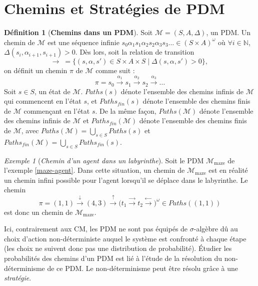 \documentclass[12pt,a4paper]{report}
\theoremstyle{definition}%
\newtheorem{definition}{Définition}[chapter]
\theoremstyle{remark}
\newtheorem{example}{Exemple}[chapter]
\begin{document}
\section{Chemins et Stratégies de PDM}

\begin{definition}[\textbf{Chemins dans un PDM}]
	Soit $\mathcal{M} = (S, A, \Delta)$, un PDM. Un chemin de $\mathcal{M}$ est une
	séquence infinie $s_0 \alpha_1 s_1 \alpha_2 s_2 \alpha_3 s_3 \dots \in (S \times A)^\omega$
	où $\forall i \in \mathbb{N}$, $\Delta(s_i, \alpha_{i+1}, s_{i+1}) > 0$. Dès lors, soit la relation de
	transition
	\[\rightarrow \; =  \{ (s, \alpha, s') \in S \times A \times S \; | \; \Delta(s, \alpha, s') > 0 \}, \,\]
	on définit un chemin $\pi$ de $\mathcal{M}$ comme suit :
	\[ \pi = s_0 \xrightarrow{\alpha_1} s_1 \xrightarrow{\alpha_2} s_2 \xrightarrow{\alpha_3} \dots \]
	Soit $s \in S$, un état de $\mathcal{M}$. $Paths(s)$ dénote l'ensemble des chemins
	infinis de $\mathcal{M}$ qui commencent en l'état $s$, et
	$Paths_{fin}(s)$ dénote l'ensemble des chemins finis de $\mathcal{M}$ commençant en l'état $s$.
	De la même façon, $Paths(\mathcal{M})$ dénote l'ensemble des chemins infinis de $\mathcal{M}$ et $Paths_{fin}(\mathcal{M})$ dénote l'ensemble des chemins finis de
	$\mathcal{M}$, avec $Paths(\mathcal{M}) = \bigcup_{s \in S} Paths(s)$ et
	$Paths_{fin}(\mathcal{M}) = \bigcup_{s \in S} Paths_{fin}(s)$.
\end{definition}

\begin{example}[\textit{Chemin d'un agent dans un labyrinthe}]
	Soit le PDM $\mathcal{M}_{\text{maze}}$ de l'exemple \ref{maze-agent}.
	Dans cette situation, un chemin de $\mathcal{M}_{\text{maze}}$ est en réalité
	un chemin infini possible pour l'agent lorsqu'il se déplace dans le labyrinthe.
	Le chemin
	\[\pi = (1,1) \xrightarrow{\downarrow} (4,3) \xrightarrow{\uparrow}
	\big(t_1 \xrightarrow{\rightarrow} t_2 \xrightarrow{\leftarrow} \big)^\omega \in Paths((1,1))\]
	est donc un chemin de $\mathcal{M}_{\text{maze}}$.

\end{example}

Ici, contrairement aux CM, les PDM ne sont pas équipés de $\sigma$-algèbre dû au
choix d'action
non-déterministe auquel le système est confronté à chaque étape (les choix ne suivent
donc pas une distribution de probabilité). \'Etudier les probabilités des chemins
d'un PDM est lié à l'étude de la résolution du non-déterminisme de ce PDM.
Le non-déterminisme peut être résolu grâce à une \textit{stratégie}.
\end{document}
